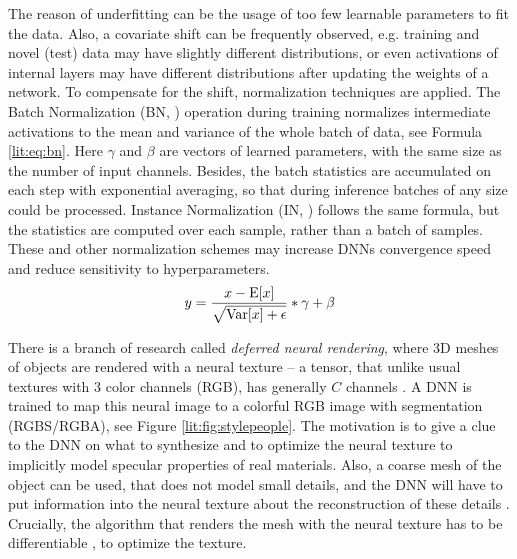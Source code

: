 The reason of underfitting can be the usage of too few learnable parameters to fit the data. Also, a covariate shift can be frequently observed, e.g. training and novel (test) data may have slightly different distributions, or even activations of internal layers may have different distributions after updating the weights of a network. To compensate for the shift, normalization techniques are applied. The Batch Normalization (BN, \cite{dnn:bn15}) operation during training normalizes intermediate activations to the mean and variance of the whole batch of data, see Formula \ref{lit:eq:bn}. Here $\gamma$ and $\beta$ are vectors of learned parameters, with the same size as the number of input channels. Besides, the batch statistics are accumulated on each step with exponential averaging, so that during inference batches of any size could be processed. Instance Normalization (IN, \cite{dnn:in16}) follows the same formula, but the statistics are computed over each sample, rather than a batch of samples. These and other normalization schemes may increase DNNs convergence speed and reduce sensitivity to hyperparameters.
\begin{equation}
	\setlength\abovedisplayskip{2pt}y = \frac{x - \mathrm{E}[x]}{\sqrt{\mathrm{Var}[x] + \epsilon}} * \gamma + \beta
	\setlength\belowdisplayskip{2pt}
	\label{lit:eq:bn}
\end{equation}

There is a branch of research called \textit{deferred neural rendering}, where 3D meshes of objects are rendered with a neural texture -- a tensor, that unlike usual textures with 3 color channels (RGB), has generally $C$ channels \cite{dnn:deferred19}. A DNN is trained to map this neural image to a colorful RGB image with segmentation (RGBS/RGBA), see Figure \ref{lit:fig:stylepeople}. The motivation is to give a clue to the DNN on what to synthesize and to optimize the neural texture to implicitly model specular properties of real materials. Also, a coarse mesh of the object can be used, that does not model small details, and the DNN will have to put information into the neural texture about the reconstruction of these details \cite{dnn:stylepeople21, dnn:anr21}. Crucially, the algorithm that renders the mesh with the neural texture has to be differentiable \cite{survey:diff-render20}, to optimize the texture.

